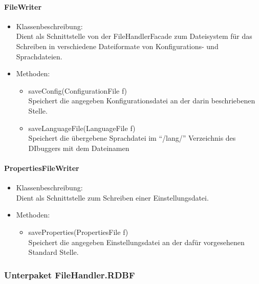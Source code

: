 \documentclass[parskip=full]{scrartcl}
\begin{document}
\paragraph{FileWriter}%
\begin{itemize}
\item Klassenbeschreibung: \\
Dient als Schnittstelle von der FileHandlerFacade zum Dateisystem für das Schreiben in verschiedene Dateiformate von Konfigurations- und Sprachdateien.
\item Methoden: \\
\begin{itemize}
\item saveConfig(ConfigurationFile f) \\
Speichert die angegeben Konfigurationsdatei an der darin beschriebenen Stelle.
\item saveLanguageFile(LanguageFile f) \\
Speichert die übergebene Sprachdatei im \enquote{/lang/} Verzeichnis des DIbuggers mit dem Dateinamen %
\end{itemize}
\end{itemize}

\paragraph{PropertiesFileWriter}
\begin{itemize}
\item Klassenbeschreibung: \\
Dient als Schnittstelle zum Schreiben einer Einstellungsdatei.
\item Methoden: \\
\begin{itemize}
\item saveProperties(PropertiesFile f) \\
Speichert die angegeben Einstellungsdatei an der dafür vorgesehenen Standard Stelle.
\end{itemize}
\end{itemize}

\subsubsection{Unterpaket FileHandler.RDBF}
\end{document}

